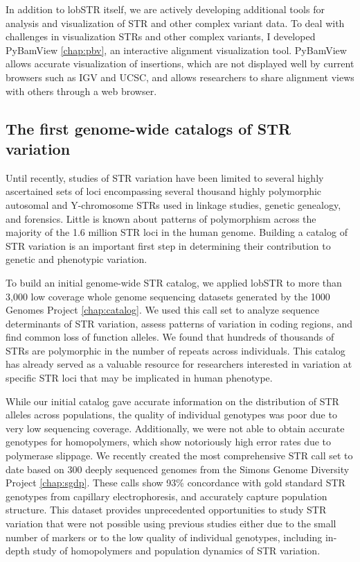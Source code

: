 In addition to lobSTR itself, we are actively developing additional tools for analysis and visualization of STR and other complex variant data. To deal with challenges in visualization STRs and other complex variants, I developed PyBamView \cite{Gymrek2014} \autoref{chap:pbv}, an interactive alignment visualization tool. PyBamView allows accurate visualization of insertions, which are not displayed well by current browsers such as IGV and UCSC, and allows researchers to share alignment views with others through a web browser.

\subsection{The first genome-wide catalogs of STR variation}
Until recently, studies of STR variation have been limited to several highly ascertained sets of loci encompassing several thousand highly polymorphic autosomal and Y-chromosome STRs used in linkage studies, genetic genealogy, and forensics. Little is known about patterns of polymorphism across the majority of the 1.6 million STR loci in the human genome. Building a catalog of STR variation is an important first step in determining their contribution to genetic and phenotypic variation.

To build an initial genome-wide STR catalog, we applied lobSTR to more than 3,000 low coverage whole genome sequencing datasets generated by the 1000 Genomes Project \cite{WillemsGymrekHighnamEtAl2014} \autoref{chap:catalog}. We used this call set to analyze sequence determinants of STR variation, assess patterns of variation in coding regions, and find common loss of function alleles. We found that hundreds of thousands of STRs are polymorphic in the number of repeats across individuals. This catalog has already served as a valuable resource for researchers interested in variation at specific STR loci that may be implicated in human phenotype. 

While our initial catalog gave accurate information on the distribution of STR alleles across populations, the quality of individual genotypes was poor due to very low sequencing coverage. Additionally, we were not able to obtain accurate genotypes for homopolymers, which show notoriously high error rates due to polymerase slippage. We recently created the most comprehensive STR call set to date based on 300 deeply sequenced genomes from the Simons Genome Diversity Project \autoref{chap:sgdp}. These calls show 93\% concordance with gold standard STR genotypes from capillary electrophoresis, and accurately capture population structure. This dataset provides unprecedented opportunities to study STR variation that were not possible using previous studies either due to the small number of markers or to the low quality of individual genotypes, including in-depth study of homopolymers and population dynamics of STR variation.

